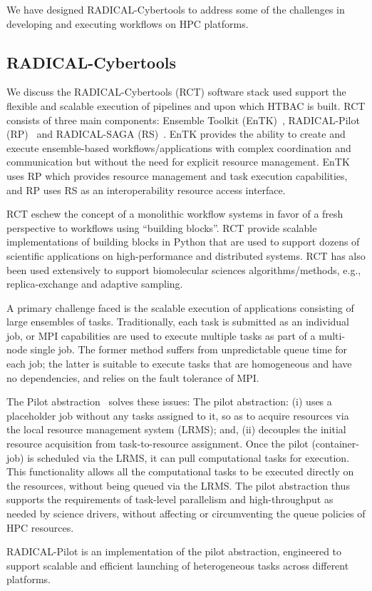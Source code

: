 
We have designed RADICAL-Cybertools to address some of the challenges in
developing and executing workflows on HPC platforms. 

\subsection{RADICAL-Cybertools}

We discuss the RADICAL-Cybertools (RCT) software stack used support the
flexible and scalable execution of pipelines and upon which HTBAC is built.
RCT consists of three main components: Ensemble Toolkit
(EnTK)~\cite{balasubramanian2016ensemble}, RADICAL-Pilot
(RP)~\cite{merzky2015radical} and RADICAL-SAGA (RS)~\cite{saga-x}. EnTK
provides the ability to create and execute ensemble-based
workflows/applications with complex coordination and communication but
without the need for explicit resource management. EnTK uses RP which
provides resource management and task execution capabilities, and RP uses RS
as an interoperability resource access interface. %

RCT eschew the concept of a monolithic workflow systems in favor of a fresh
perspective to workflows using ``building blocks''. RCT provide scalable
implementations of building blocks in Python that are used to support dozens
of scientific applications on high-performance and distributed systems. RCT
has also been used extensively to support biomolecular sciences
algorithms/methods, e.g., replica-exchange and adaptive sampling.


A primary challenge faced is the scalable execution of applications
consisting of large ensembles of tasks.  Traditionally, each task is
submitted as an individual job, or MPI capabilities are used to  execute
multiple tasks as part of a multi-node single job. The former method suffers
from unpredictable queue time for each job; the latter is suitable to execute
tasks that are homogeneous and have no dependencies, and relies on the fault
tolerance of MPI\@.

The Pilot abstraction~\cite{turilli2017comprehensive} solves these issues:
The pilot abstraction: (i) uses a placeholder job without any tasks assigned
to it, so as to acquire resources via the local resource management system
(LRMS); and, (ii) decouples the initial resource acquisition from
task-to-resource assignment. Once the pilot (container-job) is scheduled via
the LRMS, it can pull computational tasks for execution. This functionality
allows all the computational tasks to be executed directly on the resources,
without being queued via the LRMS\@. %
The pilot abstraction thus supports the requirements of task-level
parallelism and high-throughput as needed by science drivers, without
affecting or circumventing the queue policies of HPC resources.

RADICAL-Pilot is an implementation of the pilot abstraction, engineered to
support scalable and efficient launching of heterogeneous tasks across
different platforms.